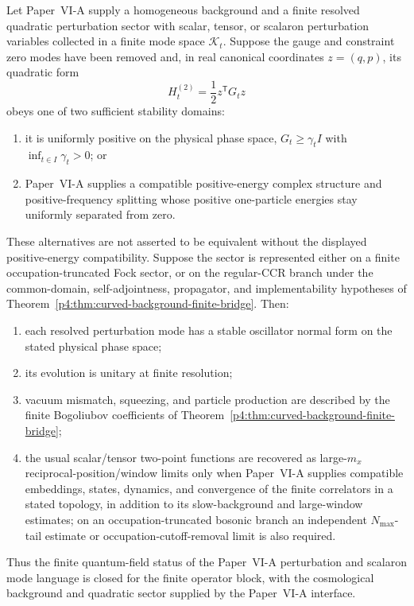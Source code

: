 \documentclass[12pt,a4paper]{article}
\begin{document}
\begin{theorem}
\label{p4:thm:finite-cosmological-perturbation-bridge}
Let Paper~VI-A supply a homogeneous background and a finite resolved
quadratic perturbation sector with scalar, tensor, or scalaron perturbation
variables collected in a finite mode space \(\mathcal K_t\).  Suppose the
gauge and constraint zero modes have been removed and, in real canonical
coordinates \(z=(q,p)\), its quadratic form
\[
H_t^{(2)}=\frac12 z^{\mathsf T}G_tz
\]
obeys one of two sufficient stability domains:
\begin{enumerate}[label=(\alph*), leftmargin=2em]
\item it is uniformly positive on the physical phase space,
\(G_t\ge\gamma_t I\) with
\(\inf_{t\in I}\gamma_t>0\); or
\item Paper~VI-A supplies a compatible positive-energy complex structure
and positive-frequency splitting whose positive one-particle energies stay
uniformly separated from zero.
\end{enumerate}
These alternatives are not asserted to be equivalent without the displayed
positive-energy compatibility.  Suppose the sector is represented either on
a finite occupation-truncated Fock sector, or on the regular-CCR branch
under the common-domain, self-adjointness, propagator, and implementability
hypotheses of
Theorem~\ref{p4:thm:curved-background-finite-bridge}.  Then:
\begin{enumerate}[label=(\roman*), leftmargin=2em]
\item each resolved perturbation mode has a stable oscillator
normal form on the stated physical phase space;
\item its evolution is unitary at finite resolution;
\item vacuum mismatch, squeezing, and particle production are described by the finite Bogoliubov coefficients of Theorem~\ref{p4:thm:curved-background-finite-bridge};
\item the usual scalar/tensor two-point functions are recovered as
large-\(m_x\) reciprocal-position/window limits only when Paper~VI-A
supplies compatible embeddings, states, dynamics, and convergence of the
finite correlators in a stated topology, in addition to its slow-background
and large-window estimates; on an occupation-truncated bosonic branch an
independent \(N_{\max}\)-tail estimate or occupation-cutoff-removal limit is
also required.
\end{enumerate}
Thus the finite quantum-field status of the Paper~VI-A perturbation and scalaron mode language is closed for the finite operator block, with the cosmological background and quadratic sector supplied by the Paper~VI-A interface.
\end{theorem}
\end{document}
